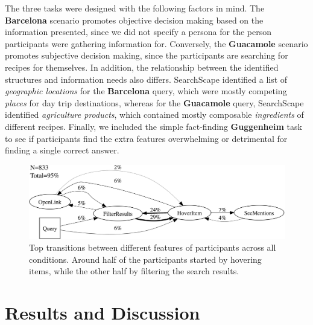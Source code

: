 The three tasks were designed with the following factors in mind. The \textbf{Barcelona} scenario promotes objective decision making based on the information presented, since we did not specify a persona for the person participants were gathering information for. Conversely, the \textbf{Guacamole} scenario promotes subjective decision making, since the participants are searching for recipes for themselves.
In addition, the relationship between the identified structures and information needs also differs. SearchScape identified a list of \emph{geographic locations} for the \textbf{Barcelona} query, which were mostly competing \emph{places} for day trip destinations, whereas for the \textbf{Guacamole} query, SearchScape identified \emph{agriculture products}, which contained mostly composable \emph{ingredients} of different recipes.
Finally, we included the simple fact-finding \textbf{Guggenheim} task to see if participants find the extra features overwhelming or detrimental for finding a single correct answer.

\begin{figure}
    \centering
    \includegraphics[width=0.7\columnwidth]{Chapters/SearchScape/figures/trans.png}
    \caption[Top transitions between different features.]{Top transitions between different features of participants across all conditions.  Around half of the participants started by hovering items, while the other half by filtering the search results.}
    \label{fig:trans}
\end{figure}


\section{Results and Discussion}


